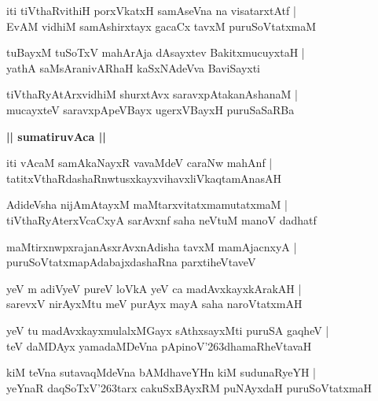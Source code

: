 \documentclass[twoside,12pt,openright]{book}
\def\S{\char'263}
\newcounter{shloka}[chapter]
\def\uvaca#1{\centerline{{\large\textbf{#1}}}}
\begin{document}
\begin{shloka}%
iti tiVthaRvithiH porxVkatxH samAseVna na visatarxtAtf |\\
EvAM vidhiM samAshirxtayx gacaCx tavxM puruSoVtatxmaM 
\end{shloka}

\begin{shloka}%
tuBayxM tuSoTxV mahArAja dAsayxtev BakitxmucuyxtaH |\\
yathA saMsAranivARhaH kaSxNAdeVva BaviSayxti
\end{shloka}

\begin{shloka}%
tiVthaRyAtArxvidhiM shurxtAvx saravxpAtakanAshanaM |\\
mucayxteV saravxpApeVBayx ugerxVBayxH puruSaSaRBa
\end{shloka}

\uvaca{|| sumatiruvAca ||}

\begin{shloka}%
iti vAcaM samAkaNayxR vavaMdeV caraNw mahAnf |\\
tatitxVthaRdashaRnwtusxkayxvihavxliVkaqtamAnasAH 
\end{shloka}

\begin{shloka}%
AdideVsha nijAmAtayxM maMtarxvitatxmamutatxmaM |\\
tiVthaRyAterxVcaCxyA sarAvxnf saha neVtuM manoV dadhatf
\end{shloka}

\begin{shloka}%
maMtirxnwpxrajanAsxrAvxnAdisha tavxM mamAjacnxyA |\\
puruSoVtatxmapAdabajxdashaRna parxtiheVtaveV 
\end{shloka}

\begin{shloka}%
yeV m adiVyeV pureV loVkA yeV ca madAvxkayxkArakAH |\\
sarevxV nirAyxMtu meV purAyx mayA saha naroVtatxmAH 
\end{shloka}

\begin{shloka}%
yeV tu madAvxkayxmulalxMGayx sAthxsayxMti puruSA gaqheV |\\
teV daMDAyx yamadaMDeVna pApinoV\S dhamaRheVtavaH 
\end{shloka}

\begin{shloka}%
kiM teVna sutavaqMdeVna bAMdhaveYHn kiM sudunaRyeYH |\\
yeYnaR daqSoTxV\S tarx cakuSxBAyxRM puNAyxdaH puruSoVtatxmaH 
\end{shloka}
\end{document}
